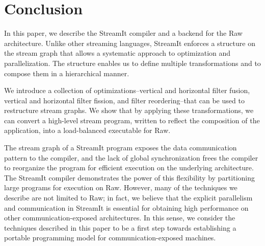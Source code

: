\section{Conclusion}
\label{sec:conclusion}

In this paper, we describe the StreamIt compiler and a backend for the
Raw architecture.  Unlike other streaming languages, StreamIt enforces
a structure on the stream graph that allows a systematic approach to
optimization and parallelization.  The structure enables us to define
multiple transformations and to compose them in a hierarchical manner.

We introduce a collection of optimizations--vertical and horizontal
filter fusion, vertical and horizontal filter fission, and filter
reordering--that can be used to restructure stream graphs.  We show
that by applying these transformations, we can convert a high-level
stream program, written to reflect the composition of the application,
into a load-balanced executable for Raw.

The stream graph of a StreamIt program exposes the data communication
pattern to the compiler, and the lack of global synchronization frees
the compiler to reorganize the program for efficient execution on the
underlying architecture. The StreamIt compiler demonstrates the power
of this flexibility by partitioning large programs for execution on
Raw.  However, many of the techniques we describe are not limited to
Raw; in fact, we believe that the explicit parallelism and
communication in StreamIt is essential for obtaining high performance
on other communication-exposed architectures.  In this sense, we
consider the techniques described in this paper to be a first step
towards establishing a portable programming model for
communication-exposed machines.
